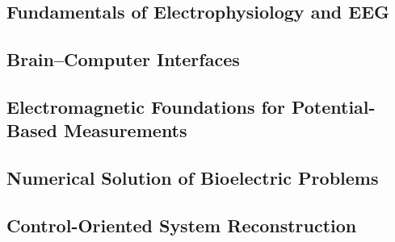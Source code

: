 \documentclass[../00_Main.tex]{subfiles}
\begin{document}
\subsection{Fundamentals of Electrophysiology and EEG}


\subsection{Brain--Computer Interfaces}


\subsection{Electromagnetic Foundations for Potential-Based Measurements}


\subsection{Numerical Solution of Bioelectric Problems}


\subsection{Control-Oriented System Reconstruction}


\biblio %
\end{document}
